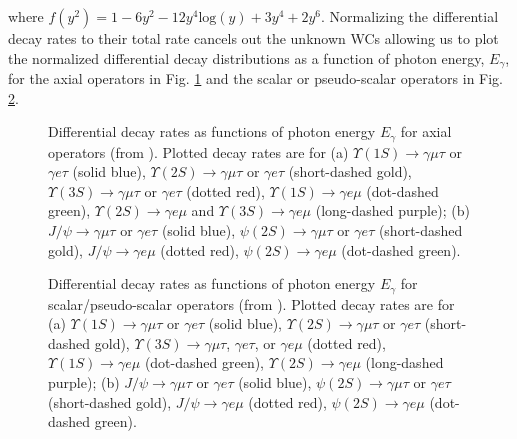 \documentclass[12pt]{article}
\begin{document}
where $f(y^2) = 1-6y^2-12y^4\text{log}\left(y\right)+3y^4+2y^6$.  Normalizing the differential decay rates to their total rate cancels out the unknown WCs allowing us to plot the normalized differential decay distributions as a function of photon energy, $E_{\gamma}$, for the axial operators in Fig. \ref{differentialdecayaxial} and the scalar or pseudo-scalar operators in Fig. \ref{differentialdecayscalar}.

\begin{figure}
\captionsetup{singlelinecheck=off}
    \caption[]{Differential decay rates as functions of photon 
    energy $E_\gamma$ for axial operators (from \cite{Hazard:2016fnc}). Plotted decay rates are for
    (a) $\Upsilon(1S) \to\gamma \mu \tau$ or $ \gamma e \tau$ (solid blue), 
    $\Upsilon(2S) \to \gamma \mu \tau$ or $\gamma e \tau$ (short-dashed gold), 
    $\Upsilon(3S) \to \gamma \mu \tau$ or $\gamma e \tau$ (dotted red),
    $\Upsilon(1S) \to \gamma e \mu$ (dot-dashed green),
    $\Upsilon(2S) \to \gamma e \mu$ and $\Upsilon(3S) \to \gamma e \mu$ (long-dashed purple);
    (b) $J/\psi \to \gamma \mu \tau$ or $\gamma e \tau$ (solid blue),
    $\psi(2S) \to \gamma \mu \tau$ or $ \gamma e \tau$ (short-dashed gold), 
    $J/\psi \to \gamma e \mu$ (dotted red),
    $\psi(2S) \to \gamma e \mu$ (dot-dashed green).}
\label{differentialdecayaxial}
\end{figure}

\begin{figure}
\captionsetup{singlelinecheck=off}
    \caption[]{Differential decay rates as functions of photon 
    energy $E_\gamma$ for scalar/pseudo-scalar operators (from \cite{Hazard:2016fnc}). Plotted decay rates are for
    (a) $\Upsilon(1S) \to \gamma \mu \tau$ or $\gamma e \tau$ (solid blue), 
    $\Upsilon(2S) \to \gamma \mu \tau$ or $ \gamma e \tau$ (short-dashed gold), 
    $\Upsilon(3S) \to \gamma \mu \tau$, $\gamma e \tau$, or $\gamma e \mu$ (dotted red),
    $\Upsilon(1S) \to \gamma e \mu$ (dot-dashed green),
    $\Upsilon(2S) \to \gamma e \mu$ (long-dashed purple);
    (b) $J/\psi \to \gamma \mu \tau$ or $\gamma e \tau$ (solid blue),
    $\psi(2S) \to \gamma \mu \tau$ or $ \gamma e \tau$ (short-dashed gold), 
    $J/\psi \to \gamma e \mu$ (dotted red),
    $\psi(2S) \to \gamma e \mu$ (dot-dashed green).}
\label{differentialdecayscalar}
\end{figure}
\end{document}
